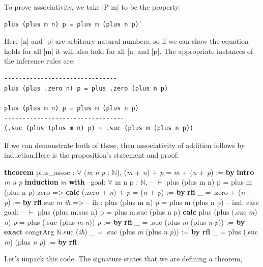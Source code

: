 \documentclass{memoir}
\newcommand{\PLFANat}{\ensuremath{\mathbb{N}}}
\newcommand{\PLFAForall}{\ensuremath{\forall}}
\newcommand{\PLFATurnstile}{\ensuremath{\vdash}}
\newcommand{\PLFAComment}[1]{\textcolor{codecomment}{#1}}
\begin{document}
\par
\par\noindent To prove associativity, we take \LeanVerb|P m| to be the property:\begin{verbatim}
plus (plus m n) p = plus m (plus n p)`
\end{verbatim}
Here \LeanVerb|n| and \LeanVerb|p| are arbitrary natural numbers, so if we can show the equation
holds for all \LeanVerb|m| it will also hold for all \LeanVerb|n| and \LeanVerb|p|. The appropriate
instances of the inference rules are:\begin{verbatim}
-------------------------------
plus (plus .zero n) p = plus .zero (plus n p)

plus (plus m n) p = plus m (plus n p)
---------------------------------
(.suc (plus (plus m n) p) = .suc (plus m (plus n p))
\end{verbatim}
If we can demonstrate both of these, then associativity of addition follows by
induction.Here is the proposition's statement and proof:\begin{LeanVerbatim}
\textbf{theorem} plus_assoc :
  \PLFAForall{} (\textit{m} \textit{n} \textit{p} : \PLFANat{}), (\textit{m} + \textit{n}) + \textit{p} = \textit{m} + (\textit{n} + \textit{p}) := \textbf{by}
    \textbf{intro} \textit{m} \textit{n} \textit{p}
    \textbf{induction} \textit{m} \textbf{with}
    \PLFAComment{--goal: \PLFAForall{} m n p : \PLFANat{},}
    \PLFAComment{--      \PLFATurnstile{} plus (plus m n) p = plus m (plus n p)}
     zero =>
        \textbf{calc}
            (.zero + \textit{n}) + \textit{p} = (\textit{n} + \textit{p})   := \textbf{by} \textbf{rfl}
          _ = .zero + (\textit{n} + \textit{p})           := \textbf{by} \textbf{rfl}
     suc \textit{m} \textit{ih} =>
        \PLFAComment{-- ih : plus (plus m n) p = plus m (plus n p)}
        \PLFAComment{-- ind. case goal:}
        \PLFAComment{--  \PLFATurnstile{} plus (plus m.suc n) p = plus m.suc (plus n p)}
        \textbf{calc}
            plus (plus (.suc \textit{m}) \textit{n}) \textit{p}
            = plus (.suc (plus \textit{m} \textit{n})) \textit{p} := \textbf{by} \textbf{rfl}
          _ = .suc (plus \textit{m} (plus \textit{n} \textit{p})) := \textbf{by}
              \textbf{exact} congrArg \PLFANat{}.suc (\textit{ih})
          _ = .suc (plus \textit{m} (plus \textit{n} \textit{p})) := \textbf{by} \textbf{rfl}
          _ = plus (.suc \textit{m}) (plus \textit{n} \textit{p}) := \textbf{by} \textbf{rfl}
\end{LeanVerbatim}
Let's unpack this code. The signature states that we are defining a theorem,
\end{document}
